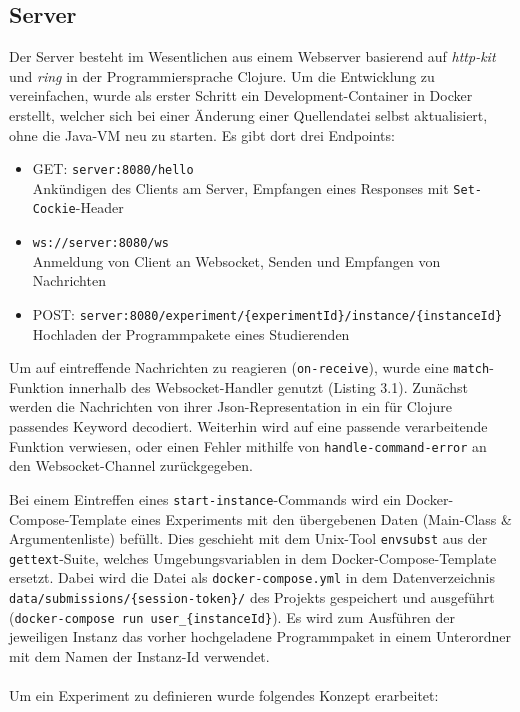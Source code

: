 \subsection{Server}
Der Server besteht im Wesentlichen aus einem Webserver basierend auf \textit{http-kit} und \textit{ring} in der Programmiersprache Clojure.
Um die Entwicklung zu vereinfachen, wurde als erster Schritt ein Development-Container in Docker erstellt, welcher sich bei einer Änderung einer Quellendatei selbst aktualisiert, ohne die Java-VM neu zu starten. Es gibt dort drei Endpoints:
\begin{itemize}
  \item GET: \texttt{server:8080/hello}
    \\ Ankündigen des Clients am Server, Empfangen eines Responses mit \texttt{Set-Cockie}-Header
  \item \texttt{ws://server:8080/ws}
    \\ Anmeldung von Client an Websocket, Senden und Empfangen von Nachrichten
  \item POST: \texttt{server:8080/experiment/\{experimentId\}/instance/\{instanceId\}}
    \\ Hochladen der Programmpakete eines Studierenden
\end{itemize}
Um auf eintreffende Nachrichten zu reagieren (\texttt{on-receive}), wurde eine \texttt{match}-Funktion innerhalb des Websocket-Handler genutzt (Listing 3.1).
Zunächst werden die Nachrichten von ihrer Json-Representation in ein für Clojure passendes Keyword decodiert.
Weiterhin wird auf eine passende verarbeitende Funktion verwiesen, oder einen Fehler mithilfe von \texttt{handle-\break command-error} an den Websocket-Channel zurückgegeben.
\par Bei einem Eintreffen eines \texttt{start-instance}-Commands wird ein Docker-Compose-Template eines Experiments mit den übergebenen Daten (Main-Class \& Argumentenliste) befüllt.
Dies geschieht mit dem Unix-Tool \texttt{envsubst} aus der \texttt{gettext}-Suite, welches Umgebungsvariablen in dem Docker-Compose-Template ersetzt.
Dabei wird die Datei als \texttt{docker-compose.yml} in dem Datenverzeichnis \texttt{data/submissions/\{session-token\}/} des Projekts gespeichert und ausgeführt (\texttt{docker-compose run user\_\{instanceId\}}).
Es wird zum Ausführen der jeweiligen Instanz das vorher hochgeladene Programmpaket in einem Unterordner mit dem Namen der Instanz-Id verwendet. 
\\\\
Um ein Experiment zu definieren wurde folgendes Konzept erarbeitet:
